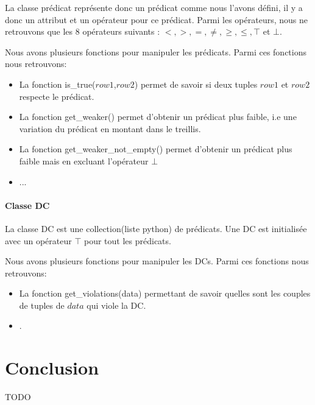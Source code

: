 \documentclass[letterpaper, 12pt]{report}
\theoremstyle{definition}
\begin{document}
La classe prédicat représente donc un prédicat comme nous l'avons défini, il y a donc un attribut et un opérateur pour ce prédicat. Parmi les opérateurs, nous ne retrouvons que les 8 opérateurs suivants : $ < , >, = , \neq , \geq , \leq , \top$ et $\bot $. 

Nous avons plusieurs fonctions pour manipuler les prédicats. Parmi ces fonctions nous retrouvons:
\begin{itemize}
\item La fonction is\_true($row1$,$row2$) permet de savoir si deux tuples $row1$ et $row2$ respecte le prédicat.
\item La fonction get\_weaker() permet d'obtenir un prédicat plus faible, i.e une variation du prédicat en montant dans le treillis.
\item La fonction get\_weaker\_not\_empty() permet d'obtenir un prédicat plus faible mais en excluant l'opérateur $\bot$
\item ...
\end{itemize}

\subsubsection{Classe DC}

La classe DC est une collection(liste python) de prédicats. Une DC est initialisée avec un opérateur $\top$ pour tout les prédicats.

Nous avons plusieurs fonctions pour manipuler les DCs. Parmi ces fonctions nous retrouvons:
\begin{itemize}
\item La fonction get\_violations(data) permettant de savoir quelles sont les couples de tuples de $data$ qui viole la DC.
\item .
\end{itemize}
\chapter{Conclusion}
TODO






\newpage
\appendix
\end{document}

